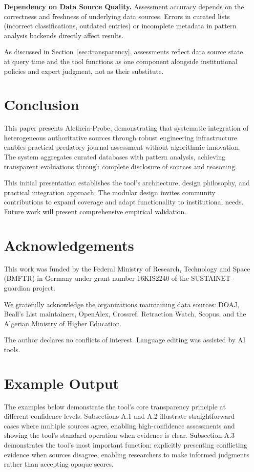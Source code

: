 \documentclass[fleqn,10pt]{SelfArx}
\begin{document}
\textbf{Dependency on Data Source Quality.} Assessment accuracy depends
on the correctness and freshness of underlying data sources. Errors in
curated lists (incorrect classifications, outdated entries) or
incomplete metadata in pattern analysis backends directly affect results.

As discussed in Section~\ref{sec:transparency}, assessments reflect
data source state at query time and the tool functions as one
component alongside institutional policies and expert judgment, not as
their substitute.

\section{Conclusion}
This paper presents Aletheia-Probe, demonstrating that systematic
integration of heterogeneous authoritative sources through robust
engineering infrastructure enables practical predatory journal
assessment without algorithmic innovation. The system aggregates curated
databases with pattern analysis, achieving transparent evaluations
through complete disclosure of sources and reasoning.

This initial presentation establishes the tool's architecture, design
philosophy, and practical integration approach. The modular design
invites community contributions to expand coverage and adapt
functionality to institutional needs. Future work will present
comprehensive empirical validation.

\section{Acknowledgements}
This work was funded by the Federal Ministry of Research, Technology
and Space (BMFTR) in Germany under grant number 16KIS2240 of the
SUSTAINET-guardian project.

We gratefully acknowledge the organizations maintaining data sources:
DOAJ, Beall's List maintainers, OpenAlex, Crossref, Retraction Watch,
Scopus, and the Algerian Ministry of Higher Education.

The author declares no conflicts of interest. Language editing was
assisted by AI tools.

\appendix

\section{Example Output}
\label{sec:examples}

The examples below demonstrate the tool's core transparency principle at
different confidence levels. Subsections A.1 and A.2 illustrate
straightforward cases where multiple sources agree, enabling
high-confidence assessments and showing the tool's standard operation
when evidence is clear. Subsection A.3 demonstrates the tool's most
important function: explicitly presenting conflicting evidence when
sources disagree, enabling researchers to make informed judgments rather
than accepting opaque scores.
\end{document}
